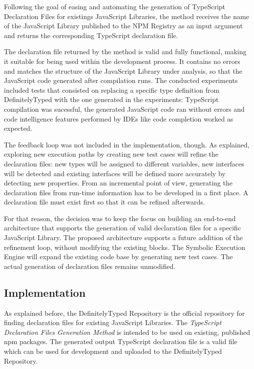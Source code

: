 Following the goal of easing and automating the generation of TypeScript Declaration Files for existings JavaScript Libraries, the method receives the name of the JavaScript Library published to the NPM Registry as an input argument and returns the corresponding TypeScript declaration file.

The declaration file returned by the method is valid and fully functional, making it suitable for being used within the development process. It contains no errors and matches the structure of the JavaScript Library under analysis, so that the JavaScript code generated after compilation runs. The conducted experiments included tests that consisted on replacing a specific type definition from DefinitelyTyped \citep{definitely-typed-repository} with the one generated in the experiments: TypeScript compilation was sucessful, the generated JavaScript code ran without errors and code intelligence features performed by IDEs like code completion worked as expected.

The feedback loop was not included in the implementation, though. As explained, exploring new execution paths by creating new test cases will refine the declaration files: new types will be assigned to different variables, new interfaces will be detected and existing interfaces will be defined more accurately by detecting new properties. From an incremental point of view, generating the declaration files from run-time information has to be developed in a first place. A declaration file must exist first so that it can be refined afterwards.

For that reason, the decision was to keep the focus on building an end-to-end architecture that supports the generation of valid declaration files for a specific JavaScript Library. The proposed architecture supports a future addition of the refinement loop, without modifying the existing blocks. The Symbolic Execution Engine will expand the existing code base by generating new test cases. The actual generation of declaration files remains unmodified. 

\subsection{Implementation}
As explained before, the DefinitelyTyped Repository is the official repository for finding declaration files for existing JavaScript Libraries. The \textit{TypeScript Declaration Files Generation Method} is intended to be used on existing, published npm packages. The generated output TypeScript declaration file is a valid file which can be used for development and uploaded to the DefinitelyTyped Repository.

